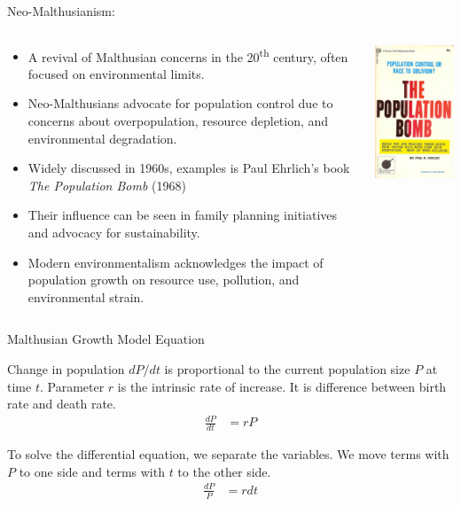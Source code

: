 \begin{frame}{Neo-Malthusianism:}
\small
\begin{columns}
    \begin{column}{0.7\textwidth}
        \begin{itemize}
    \item A revival of Malthusian concerns in the 20\textsuperscript{th}  century, often focused on environmental limits.
\item Neo-Malthusians advocate for population control due to concerns about overpopulation, resource depletion, and environmental degradation.
\item Widely discussed in 1960s, examples is Paul Ehrlich's book \textit{The Population Bomb} (1968)
\item Their influence can be seen in family planning initiatives and advocacy for sustainability.
\item Modern environmentalism acknowledges the impact of population growth on resource use, pollution, and environmental strain.
\end{itemize}
    \end{column}
        \begin{column}{0.3\textwidth}
        \includegraphics{lesson_1/images/malthus_population_bomb.jpg}
        
    \end{column}
\end{columns}




\end{frame}


\begin{frame}{Malthusian Growth Model Equation}

 Change in population $dP/dt$ is proportional to the current population size $P$ at time $t$. Parameter $r$ is the intrinsic rate of increase. It is difference between birth rate and death rate. 
    \begin{align*}
    \frac{dP}{dt} &= rP
  \end{align*}
\vfill

To solve the differential equation, we separate the variables.
 We move terms with $P$ to one side and terms with $t$ to the other side.
    \begin{align*}
    \frac{dP}{P} &= rdt
  \end{align*}
\end{frame}


